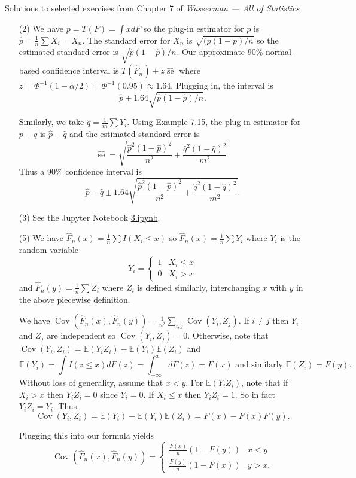 \documentclass[10pt]{article}
\newcommand{\E}{\mathbb{E}}
\newcommand{\se}{\operatorname{se}}
\newcommand{\Cov}{\operatorname{Cov}}
\begin{document}
\noindent \large{Solutions to selected exercises from Chapter 7 of
\emph{Wasserman --- All of Statistics}}

\begin{enumerate}
\item[(2)]
We have $p=T(F)=\int xdF$ so the plug-in estimator for $p$ is
$\hat{p}=\frac{1}{n}\sum X_i = \overline{X_n}$. The standard error for
$\overline{X_n}$ is $\sqrt{(p(1-p)/n}$ so the estimated standard error is
$\sqrt{\hat p(1-\hat p)/n}$. Our approximate 90\% normal-based
confidence interval is $T(\widehat F_n) \pm z \widehat{\se}$ where
$z=\Phi^{-1}(1-\alpha/2)=\Phi^{-1}(0.95) \approx 1.64$. Plugging in,
the interval is
\[
\hat p \pm 1.64 \sqrt{\hat p(1-\hat p)/n}.
\]

Similarly, we take $\hat q = \frac{1}{m}\sum Y_i$. Using Example 7.15, the plug-in
estimator for $p-q$ is $\hat p - \hat q$ and the estimated standard error is
\[
\widehat{\se} =
\sqrt{\frac{\hat p^2(1-\hat p)^2}{n^2} + \frac{\hat q^2(1-\hat q)^2}{m^2}}.
\]
Thus a 90\% confidence interval is
\[
\hat p - \hat q \pm
1.64\sqrt{\frac{\hat p^2(1-\hat p)^2}{n^2} + \frac{\hat q^2(1-\hat q)^2}{m^2}}.
\]

\item[(3)]
See the Jupyter Notebook
\href{https://github.com/ajrasmus/some_of_statistics/blob/main/chapter_7/3.ipynb}{3.ipynb}.

\item[(5)]
We have $\hat F_n(x) = \frac{1}{n} \sum I(X_i \leq x)$ so $\hat F_n(x) =
\frac{1}{n} \sum Y_i$ where $Y_i$ is the random variable
\[
Y_i = \begin{cases}
1 & X_i \leq x \\
0 & X_i > x
\end{cases}
\]
and $\hat F_n(y)=\frac{1}{n} \sum Z_i$ where $Z_i$ is defined similarly,
interchanging $x$ with $y$ in the above piecewise definition.

We have $\Cov(\hat F_n(x), \hat F_n(y))=\frac{1}{n^2} \sum_{i,j} \Cov(Y_i, Z_j)$.
If $i\neq j$ then $Y_i$ and $Z_j$ are
independent so $\Cov(Y_i,Z_j)=0$. Otherwise, note
that $\Cov(Y_i,Z_i) = \E(Y_i Z_i) - \E(Y_i)\E(Z_i)$ and
\[
\E(Y_i) = \int I(z\leq x) dF(z) = \int_{-\infty}^x dF(z) = F(x)
\text{ and similarly }
\E(Z_i) = F(y).
\]
Without loss of generality, assume that $x<y$.
For $\E(Y_iZ_i)$, note that if $X_i>x$ then $Y_iZ_i=0$ since $Y_i=0$.
If $X_i\leq x$ then $Y_iZ_i=1$. So in fact $Y_iZ_i=Y_i$.
Thus,
\[
\Cov(Y_i,Z_i) = \E(Y_i) - \E(Y_i)\E(Z_i) = F(x) - F(x)F(y).
\]

Plugging this into our formula yields
\[
\Cov(\hat F_n(x), \hat F_n(y)) =
\begin{cases}
\frac{F(x)}{n}(1- F(y)) & x < y \\
\frac{F(y)}{n}(1-F(x)) & y > x.
\end{cases}
\]


\end{enumerate}
\end{document}
